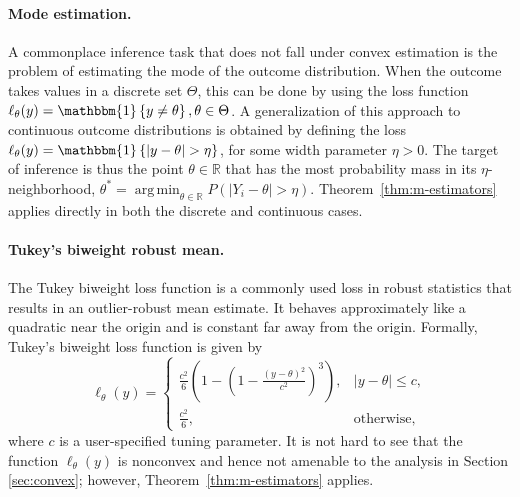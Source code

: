 \documentclass[10pt]{article}
\def\R{\mathbb{R}}
\def\E{\mathbb{E}}
\newcommand{\ind}[1]{\mathbbm{1}\left\{#1\right\}}
\newcommand{\tY}{\widetilde{Y}}
\DeclareMathOperator*{\argmin}{arg\,min}
\newcommand{\clara}[1]{{\color[rgb]{0, 0.8, 0}[Clara: #1]}}
\begin{document}
\paragraph{Mode estimation.}
A commonplace inference task that does not fall under convex estimation is the problem of estimating the mode of the outcome distribution. When the outcome takes values in a discrete set $\Theta$, this can be done by using the loss function $\ell_\theta(y) = \ind{y \neq \theta}, \theta\in\Theta$. A generalization of this approach to continuous outcome distributions is obtained by defining the loss
$\ell_\theta(y) = \ind{|y - \theta| > \eta}$,
for some width parameter $\eta>0$. The target of inference is thus the point $\theta\in\R$ that has the most probability mass in its $\eta$-neighborhood, $\theta^* = \argmin_{\theta\in\R} P\left(|Y_i - \theta| > \eta\right)$.
Theorem~\ref{thm:m-estimators} applies directly in both the discrete and continuous cases.

\paragraph{Tukey's biweight robust mean.} The Tukey biweight loss function is a commonly used loss in robust statistics that results in an outlier-robust mean estimate. It behaves approximately like a quadratic near the origin and is constant far away from the origin. Formally, Tukey's biweight loss function is given by
$$\ell_\theta(y) =
\begin{cases}
\frac{c^2}{6}\left(1 - \left(1 - \frac{\left(y-\theta\right)^2}{c^2}\right)^3 \right), &|y-\theta|\leq c,\\
\frac{c^2}{6}, &\text{otherwise},
\end{cases}$$
where $c$ is a user-specified tuning parameter. It is not hard to see that the function $\ell_\theta(y)$ is nonconvex and hence not amenable to the analysis in Section \ref{sec:convex}; however, Theorem~\ref{thm:m-estimators} applies.

\end{document}
